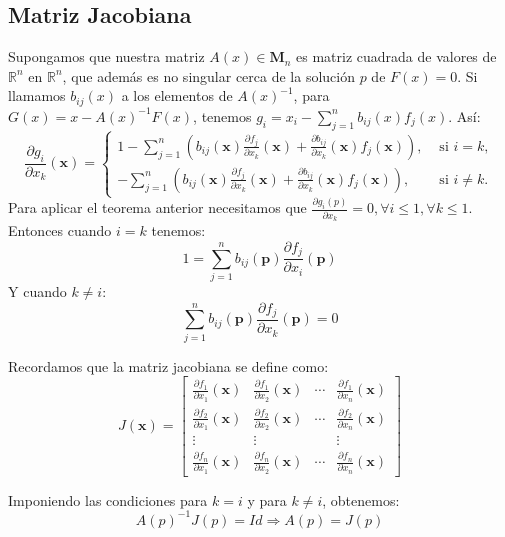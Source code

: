 \subsection{Matriz Jacobiana}

Supongamos que nuestra matriz $A(x) \in \mathbf{M}_n$ es matriz cuadrada de valores de $\mathbb{R}^n$ en $\mathbb{R}^n$, que además es no singular cerca de la solución $p$ de $F(x) = 0$. Si llamamos $b_{ij}(x)$ a los elementos de $A(x)^{-1}$, para $G(x) = x - A(x)^{-1}F(x)$, tenemos $g_i = x_i - \sum_{j=1}^{n} b_{ij}(x)f_j(x)$. Así:
\[\frac{\partial g_{i}}{\partial x_{k}}(\mathbf{x})=\left\{\begin{array}{ll}
	1-\sum_{j=1}^{n}\left(b_{i j}(\mathbf{x}) \frac{\partial f_{j}}{\partial x_{k}}(\mathbf{x})+\frac{\partial b_{i j}}{\partial x_{k}}(\mathbf{x}) f_{j}(\mathbf{x})\right), & \text { si } i=k ,\\
	-\sum_{j=1}^{n}\left(b_{i j}(\mathbf{x}) \frac{\partial f_{j}}{\partial x_{k}}(\mathbf{x})+\frac{\partial b_{i j}}{\partial x_{k}}(\mathbf{x}) f_{j}(\mathbf{x})\right), & \text { si } i \neq k .
\end{array}\right.\]
Para aplicar el teorema anterior necesitamos que $\frac{\partial g_i(p)}{\partial x_k} = 0, \forall i \leq 1, \forall k \leq 1$. Entonces cuando $i = k$ tenemos:
\[1=\sum_{j=1}^{n} b_{i j}(\mathbf{p}) \frac{\partial f_{j}}{\partial x_{i}}(\mathbf{p})\]
Y cuando $k \neq i$:
\[\sum_{j=1}^{n} b_{i j}(\mathbf{p}) \frac{\partial f_{j}}{\partial x_{k}}(\mathbf{p})=0\]

Recordamos que la matriz jacobiana se define como:
\[J(\mathbf{x})=\left[\begin{array}{cccc}
	\frac{\partial f_{1}}{\partial x_{1}}(\mathbf{x}) & \frac{\partial f_{1}}{\partial x_{2}}(\mathbf{x}) & \cdots & \frac{\partial f_{1}}{\partial x_{n}}(\mathbf{x}) \\
	\frac{\partial f_{2}}{\partial x_{1}}(\mathbf{x}) & \frac{\partial f_{2}}{\partial x_{2}}(\mathbf{x}) & \cdots & \frac{\partial f_{2}}{\partial x_{n}}(\mathbf{x}) \\
	\vdots & \vdots & & \vdots \\
	\frac{\partial f_{n}}{\partial x_{1}}(\mathbf{x}) & \frac{\partial f_{n}}{\partial x_{2}}(\mathbf{x}) & \cdots & \frac{\partial f_{n}}{\partial x_{n}}(\mathbf{x})
\end{array}\right]\]

Imponiendo las condiciones para $k = i$ y para $k \neq i$, obtenemos:
\[A(p)^{-1}J(p) = Id \Rightarrow A(p) = J(p)\]

